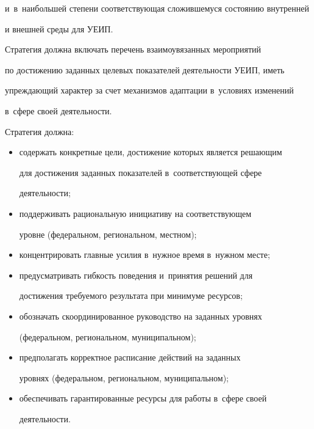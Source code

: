 и~в~наибольшей степени соответствующая сложившемуся состоянию внутренней 

и внешней среды для УЕИП.

     

     Стратегия должна включать перечень взаимоувязанных мероприятий 

по достижению заданных целевых показателей деятельности УЕИП, иметь 

упреждающий характер за счет механизмов адаптации в~условиях изменений 

в~сфере своей деятельности.

     

     Стратегия должна:

     \begin{itemize}

\item содержать конкретные цели, достижение которых является решающим 

для достижения заданных показателей в~соответствующей сфере 

деятельности;

     \item поддерживать рациональную инициативу на соответствующем 

уровне (федеральном, региональном, местном);

     \item концентрировать главные усилия в~нужное время в~нужном месте;

\item  предусматривать гибкость поведения и~принятия решений для 

достижения требуемого результата при минимуме ресурсов;

     \item обозначать скоординированное руководство на заданных уровнях 

(федеральном, региональном, муниципальном);

     \item предполагать корректное расписание действий на заданных 

уровнях (федеральном, региональном, муниципальном);

     \item обеспечивать гарантированные ресурсы для работы в~сфере своей 

деятель\-ности.

     \end{itemize}

     


